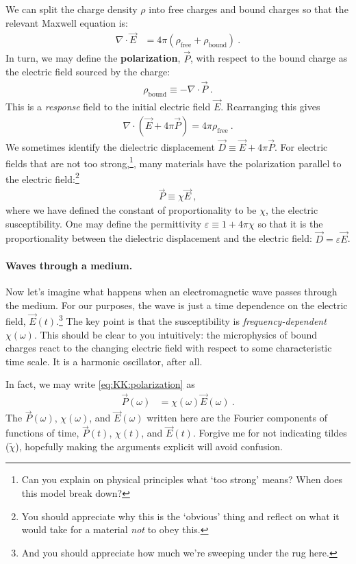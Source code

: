 We can split the charge density $\rho$ into free charges and bound charges so that the relevant Maxwell equation is:
\begin{align}
	\nabla \cdot \vec{E} &= 4\pi (\rho_\text{free} + \rho_\text{bound}) \ .
\end{align}
In turn, we may define the \textbf{polarization}, $\vec{P}$, with respect to the bound charge as the electric field sourced by the charge:
\begin{align}
	\rho_{\text{bound}} \equiv - \nabla \cdot\vec{P} \ .
\end{align}
This is a \emph{response} field to the initial electric field $\vec E$. Rearranging this gives
\begin{align}
	\nabla \cdot (\vec{E} + 4\pi \vec{P}) = 4\pi \rho_\text{free} \ .
\end{align}
We sometimes identify the dielectric displacement $\vec{D} \equiv \vec{E} + 4\pi \vec{P}$. For electric fields that are not too strong,\footnote{Can you explain on physical principles what `too strong' means? When does this model break down?}, many materials have the polarization parallel to the electric field:\footnote{You should appreciate why this is the `obvious' thing and reflect on what it would take for a material \emph{not} to obey this.}
\begin{align}
	\vec{P} \equiv \chi \vec{E} \ ,
	\label{eq:KK:polarization}
\end{align}
where we have defined the constant of proportionality to be $\chi$, the electric susceptibility. One may define the permittivity $\varepsilon \equiv 1+4\pi\chi$ so that it is the proportionality between the dielectric displacement and the electric field: $\vec{D} = \varepsilon \vec{E}$.

\paragraph{Waves through a medium.} Now let's imagine what happens when an electromagnetic wave passes through the medium. For our purposes, the wave is just a time dependence on the electric field, $\vec{E}(t)$.\footnote{And you should appreciate how much we're sweeping under the rug here.} The key point is that the susceptibility is \emph{frequency-dependent} $\chi(\omega)$. This should be clear to you intuitively: the microphysics of bound charges react to the changing electric field with respect to some characteristic time scale. It is a harmonic oscillator, after all.


In fact, we may write \eqref{eq:KK:polarization} as
\begin{align}
	\vec{P}(\omega) &= \chi(\omega) \vec E(\omega) \ .
	\label{eq:KK:P:XE}
\end{align}
The $\vec{P}(\omega)$, $\chi(\omega)$, and $\vec{E}(\omega)$ written here are the Fourier components of functions of time, $\vec{P}(t)$, $\chi(t)$, and $\vec{E}(t)$. Forgive me for not indicating tildes ($\tilde \chi$), hopefully making the arguments explicit will avoid confusion.


